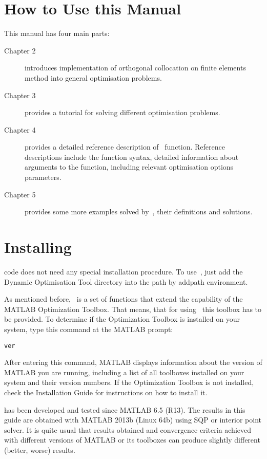 \section{How to Use this Manual}
\label{sec:howtouseman}

This manual has four main parts:
\begin{description}
\item[Chapter 2] introduces implementation of orthogonal collocation
  on finite elements method into general optimisation problems.
\item[Chapter 3] provides a tutorial for solving different
  optimisation problems.
\item[Chapter 4] provides a detailed reference description
  of~ function. Reference descriptions include the
  function syntax, detailed information about arguments to the
  function, including relevant optimisation options parameters.
\item[Chapter 5] provides some more examples solved by~,
  their definitions and solutions.
\end{description}

\section{Installing~}
\label{sec:instdynopt}

 code does not need any special installation procedure. To
use~, just add the Dynamic Optimisation Tool directory
 into the path by addpath environment. 

As mentioned before,~ is a set of functions that extend
the capability of the MATLAB Optimization Toolbox. That means, that
for using~ this toolbox has to be provided. To determine
if the Optimization Toolbox is installed on your system, type this
command at the MATLAB prompt:
\begin{verbatim}
ver
\end{verbatim}
After entering this command, MATLAB displays information about the
version of MATLAB you are running, including a list of all toolboxes
installed on your system and their version numbers.  If the
Optimization Toolbox is not installed, check the Installation Guide
for instructions on how to install it.

 has been developed and tested since MATLAB 6.5 (R13). The
results in this guide are obtained with MATLAB 2013b (Linux 64b) using
SQP or interior point solver. It is quite usual that results obtained
and convergence criteria achieved with different versions of MATLAB or
its toolboxes can produce slightly different (better, worse) results.



